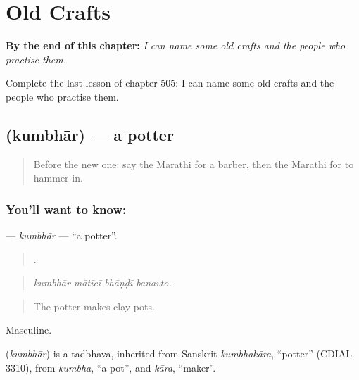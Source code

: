 
\chapter{Old Crafts}
\label{ch:mr-old-crafts}

\begin{chapteropening}
\textbf{By the end of this chapter:} \emph{I can name some old crafts and the people who practise them.}

Complete the last lesson of chapter 505: I can name some old crafts and the people who practise them.
\end{chapteropening}

\section[\texorpdfstring{\mr{कुंभार} (kumbhār)}{कुंभार (kumbhār)}]{ (kumbhār) — a potter}

\label{lesson:MR-C505-kumbhar}



\begin{quote}
Before the new one: say the Marathi for a barber, then the Marathi for to hammer in.
\end{quote}

\subsection*{You'll want to know: }
\textbf{} — \emph{kumbhār} — \textquotedblleft{}a potter\textquotedblright{}.

\begin{quote}
   .
\end{quote}

\begin{quote}
\emph{kumbhār mātīcī bhāṇḍī banavto.}
\end{quote}

\begin{quote}
The potter makes clay pots.
\end{quote}

Masculine.

\begin{cousinweb}
\textbf{} (\emph{kumbhār}) is a tadbhava, inherited from Sanskrit \emph{kumbhakāra}, \textquotedblleft{}potter\textquotedblright{} (CDIAL 3310), from \emph{kumbha}, \textquotedblleft{}a pot\textquotedblright{}, and \emph{kāra}, \textquotedblleft{}maker\textquotedblright{}.
\end{cousinweb}

